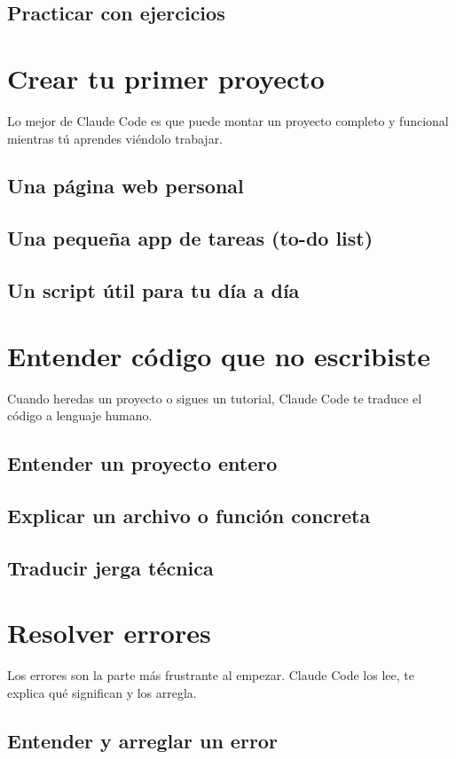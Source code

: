 \documentclass[11pt,a4paper]{book}
\begin{document}
\subsection{Practicar con ejercicios}
\section{Crear tu primer proyecto}
Lo mejor de Claude Code es que puede montar un proyecto completo y funcional mientras tú aprendes viéndolo trabajar.

\subsection{Una página web personal}
\subsection{Una pequeña app de tareas (to-do list)}
\subsection{Un script útil para tu día a día}
\section{Entender código que no escribiste}
Cuando heredas un proyecto o sigues un tutorial, Claude Code te traduce el código a lenguaje humano.

\subsection{Entender un proyecto entero}
\subsection{Explicar un archivo o función concreta}
\subsection{Traducir jerga técnica}
\section{Resolver errores}
Los errores son la parte más frustrante al empezar. Claude Code los lee, te explica qué significan y los arregla.

\subsection{Entender y arreglar un error}
\end{document}

